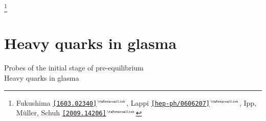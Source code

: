 \documentclass[aspectratio=169,11pt,usenames,dvipsnames]{beamer}
\renewcommand{\thefootnote}{\color{customblue}\faPaperPlaneO}
\newcommand\blfootnote[1]{%
  \begingroup
  \renewcommand\thefootnote{}\footnote{#1}%
  \addtocounter{footnote}{-1}%
  \endgroup
}
\begin{document}
\begin{frame}
\begin{columns}[onlytextwidth,t]
    \end{columns}
    \blfootnote{\scriptsize Fukushima \href{https://arxiv.org/abs/1603.02340}{{\color{palteal}\texttt{[1603.02340]}$^\text{\tiny\faExternalLink}$}}, Lappi \href{https://arxiv.org/abs/hep-ph/0606207}{{\color{palviolet}\texttt{[hep-ph/0606207]}$^\text{\tiny\faExternalLink}$}}, Ipp, Müller, Schuh \href{https://arxiv.org/abs/2009.14206}{{\color{palgold}\texttt{[2009.14206]}$^\text{\tiny\faExternalLink}$}}}
\end{frame}



\section{Heavy quarks in glasma}


\begin{frame}{}
    \begin{center}
        \vspace{1cm}
        {\large\color{normal}Probes of the initial stage of pre-equilibrium}\\[0.3cm]
        {\huge\color{destacado}Heavy quarks in glasma}\\[0.3cm]
    \end{center}
\end{frame}
\end{document}
